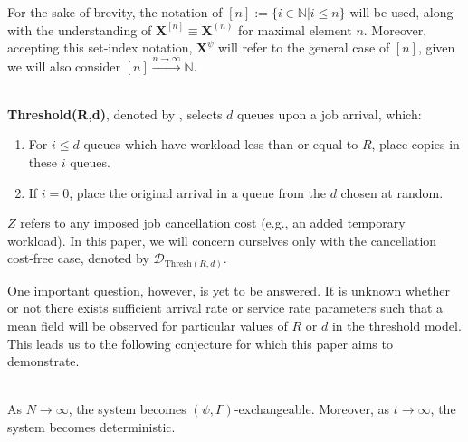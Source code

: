 For the sake of brevity, the notation of $[n] := \{i \in \mathbb{N} | i \leq n\}$ will be used, along with the understanding of $\mathbf{X}^{[n]} \equiv \mathbf{X}^{(n)}$ for maximal element $n$.
Moreover, accepting this set-index notation, $\mathbf{X}^{\psi}$ will refer to the general case of $[n]$, given we will also consider $[n] \overset{n\rightarrow \infty}\longrightarrow \mathbb{N}$.

\begin{definition}[Threshold$(R,d)$]
    \hfill \\
    \textbf{Threshold(R,d)}, denoted by , selects $d$ queues upon a job arrival,
    which:
    \begin{enumerate}
        \item For $i \leq d$ queues which have workload less than or equal to $R$, place copies in these $i$ queues.
        \item If $i=0$, place the original arrival in a queue from the $d$ chosen at random.
    \end{enumerate}
    $Z$ refers to any imposed job cancellation cost (e.g., an added temporary workload).
    In this paper, we will concern
    ourselves only with the cancellation cost-free case, denoted by \normalfont $\mathcal{D}_{\text{Thresh}(R,d)}$.
\end{definition}


One important question, however, is yet to be answered.
It is unknown whether or not there exists sufficient arrival rate or service rate parameters such that a mean field will be observed for particular values of $R$ or $d$ in the threshold model.
This leads us to the following conjecture for which this paper aims to demonstrate.
\begin{conjecture}
    \hfill \\
    As $N \longrightarrow \infty$, the system  becomes $(\psi, \Gamma)$-exchangeable.
    Moreover, as $t \longrightarrow \infty$, the system becomes deterministic.
    \label{conj}
\end{conjecture}


